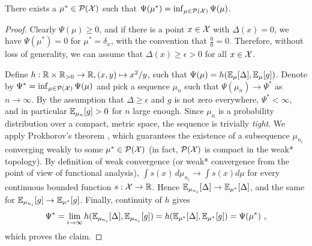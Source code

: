\begin{lemma}\label{lemma: minimizer of psi exists}
 	There exists a $\mu^* \in \mathcal{P}(\mathcal{X})$ such that $\Psi(\mu^*) = \inf_{\mu \in \mathcal{P}(\mathcal{X})} \Psi(\mu)$.
\end{lemma}
\begin{proof} Clearly $\Psi(\mu) \geq 0$, and if there is a point $x \in \mathcal{X}$ with $\Delta(x) = 0$, we have $\Psi(\mu^*) = 0$ for $\mu^* = \delta_x$, with the convention that $\tfrac{0}{0} = 0$. Therefore, without loss of generality, we can assume that $\Delta(x) \geq \epsilon > 0$ for all $x \in \mathcal{X}$.
	
	Define $h : \mathbb{R}\times\mathbb{R}_{> 0} \rightarrow \mathbb{R}, (x,y) \mapsto x^2/y$, such that $\Psi(\mu) = h(\mathbb{E}_{\mu}[\Delta], \mathbb{E}_{\mu}[g])$. Denote by $\Psi^* = \inf_{\mu \in \mathcal{P}(\mathcal{X})} \Psi(\mu)$ and pick a sequence $\mu_n$ such that $\Psi(\mu_n) \rightarrow \Psi^*$ as $n \rightarrow \infty$. By the assumption that $\Delta \geq \epsilon$ and $g$ is not zero everywhere, $\Psi^* < \infty$, and in particular $\mathbb{E}_{\mu_n}[g] > 0$ for $n$ large enough. Since $\mu_n$ is a probability distribution over a compact, metric space, the sequence is trivially \emph{tight}. We apply Prokhorov's theorem \cite[]{ProkhorovConvergenceRandomProcesses1956}, which guarantees the existence of a subsequence $\mu_{n_i}$ converging weakly to some $\mu^* \in \mathcal{P}(\mathcal{X})$ (in fact, $\mathcal{P}(\mathcal{X})$ is compact in the weak* topology). By definition of weak convergence (or weak* convergence from the point of view of functional analysis), $\int s(x) \,d\mu_{n_i} \rightarrow \int s(x) d \mu$ for every continuous bounded function $s: \mathcal{X} \rightarrow \mathbb{R}$. Hence $\mathbb{E}_{\mu_{n_i}}[\Delta] \rightarrow \mathbb{E}_{\mu^*}[\Delta]$, and the same for  $\mathbb{E}_{\mu_{n_i}}[g] \rightarrow \mathbb{E}_{\mu^*}[g]$. Finally, continuity of $h$ gives 
	\begin{align*}
	\Psi^* = \lim_{i \rightarrow \infty} h(\mathbb{E}_{\mu_{n_i}}[\Delta], \mathbb{E}_{\mu_{n_i}}[g]) = h(\mathbb{E}_{\mu^*}[\Delta], \mathbb{E}_{\mu^*}[g]) = \Psi(\mu^*) \text{ ,}
	\end{align*} 
	which proves the claim.
\end{proof}

